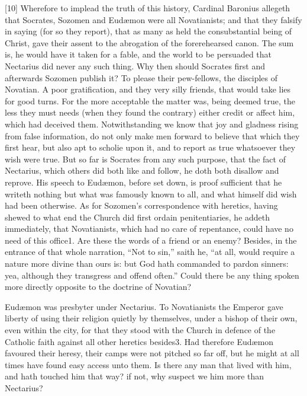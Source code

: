 [10] Wherefore to implead the truth of this history, Cardinal Baronius allegeth that Socrates, Sozomen and Eudæmon were all Novatianists; and that they falsify in saying (for so they report), that as many as held the consubstantial being of Christ, gave their assent to the abrogation of the forerehearsed canon. The sum is, he would have it taken for a fable, and the world to be persuaded that Nectarius did never any such thing. Why then should Socrates first and afterwards Sozomen publish it? To please their pew-fellows, the disciples of Novatian. A poor gratification, and they very silly friends, that would take lies for good turns. For the more acceptable the matter was, being deemed true, the less they must needs (when they found the contrary) either credit or affect him, which had deceived them. Notwithstanding we know that joy and gladness rising from false information, do not only make men forward to believe that which they  first hear, but also apt to scholie upon it, and to report as true whatsoever they wish were true. But so far is Socrates from any such purpose, that the fact of Nectarius, which others did both like and follow, he doth both disallow and reprove. His speech to Eudæmon, before set down, is proof sufficient that he writeth nothing but what was famously known to all, and what himself did wish had been otherwise. As for Sozomen’s correspondence with heretics, having shewed to what end the Church did first ordain penitentiaries, he addeth immediately, that Novatianists, which had no care of repentance, could have no need of this office1. Are these the words of a friend or an enemy? Besides, in the entrance of that whole narration, “Not to sin,” saith he, “at all, would require a nature more divine than ours is: but God hath commanded to pardon sinners: yea, although they transgress and offend often.” Could there be any thing spoken more directly opposite to the doctrine of Novatian?

Eudæmon was presbyter under Nectarius. To Novatianists the Emperor gave liberty of using their religion quietly by themselves, under a bishop of their own, even within the city, for that they stood with the Church in defence of the Catholic faith against all other heretics besides3. Had therefore Eudæmon favoured their heresy, their camps were not pitched so far off, but he might at all times have found easy access unto them. Is there any man that lived with him, and hath touched him that way? if not, why suspect we him more than Nectarius?

